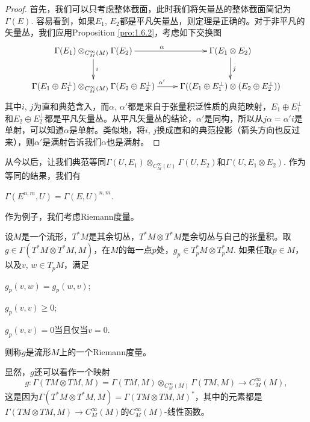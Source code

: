 \begin{proof}
	首先，我们可以只考虑整体截面，此时我们将矢量丛的整体截面简记为$\Gamma(E)$. 容易看到，如果$E_1$, $E_2$都是平凡矢量丛，则定理是正确的。对于非平凡的矢量丛，我们应用Proposition \ref{pro:1.6.2}，考虑如下交换图
	\[
	\begin{xy}
		\xymatrix{
		\Gamma(E_1) \otimes_{C^{\infty}_M(M)} \Gamma(E_2)\ar[r]^\alpha\ar[d]^i & \Gamma(E_1 \otimes E_2) \ar[d]^{j}\\
		\Gamma(E_1 \oplus E_1^{\perp}) \otimes_{C^{\infty}_M(M)} \Gamma(E_2 \oplus E_2^{\perp}) \ar[r]^{\alpha'}& \Gamma((E_1 \oplus E_1^{\perp}) \otimes (E_2 \oplus E_2^{\perp})) 
		}
	\end{xy}
	\]
	其中$i$, $j$为直和典范含入，而$\alpha$, $\alpha'$都是来自于张量积泛性质的典范映射，$E_1 \oplus E_1^{\perp}$和$E_2 \oplus E_2^{\perp}$都是平凡矢量丛。从平凡矢量丛的结论，$\alpha'$是同构，所以从$j\alpha=\alpha'i$是单射，可以知道$\alpha$是单射。类似地，将$i$, $j$换成直和的典范投影（箭头方向也反过来），则$\alpha'$是满射告诉我们$\alpha$也是满射。
\end{proof}

从今以后，让我们典范等同$\Gamma(U,E_1)\otimes_{C^{\infty}_M(U)} \Gamma(U,E_2)$和$\Gamma(U,E_1\otimes E_2)$. 作为等同的结果，我们有

\begin{pro}
	$\Gamma(E^{n,m},U)=\Gamma(E,U)^{n,m}$.
\end{pro}

作为例子，我们考虑Riemann度量。

\begin{para}[Riemann度量]
	设$M$是一个流形，$T^*M$是其余切丛，$T^*M\otimes T^*M$是余切丛与自己的张量积。取$g\in \Gamma(T^*M\otimes T^*M,M)$，在$M$的每一点$p$处，$g_p\in T^*_pM\otimes T^*_p M$. 如果任取$p\in M$，以及$v$, $w\in T_pM$，满足
	\begin{compactenum}[~~~~(1)]
	\item $g_p(v,w)=g_p(w,v)$;
	\item $g_p(v,v)\geq 0$;
	\item $g_p(v,v)=0$当且仅当$v=0$.
	\end{compactenum}
	则称$g$是流形$M$上的一个Riemann度量。

	显然，$g$还可以看作一个映射
	\[
		g:\Gamma(TM\otimes TM,M)=\Gamma(TM,M)\otimes_{C^\infty_M(M)} \Gamma(TM,M) \to C^\infty_M(M),
	\]
	这是因为$\Gamma(T^*M\otimes T^*M,M)=\Gamma(TM\otimes TM,M)^*$，其中的元素都是$\Gamma(TM\otimes TM,M)\to C^\infty_M(M)$的$C^\infty_M(M)$-线性函数。
\end{para}
	
